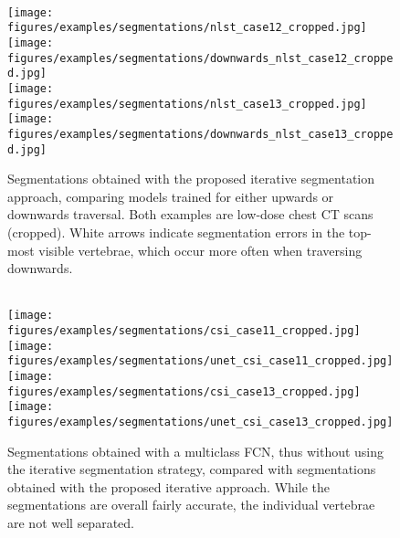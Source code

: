 \documentclass[authoryear,5p,final,times]{elsarticle}
\begin{document}
	\begin{figure*}[t]
    	\begin{minipage}[t]{0.49\textwidth}
    	    \centering%
    	    \begin{minipage}[t]{\columnwidth}
        		\footnotesize\centering%
                \hspace{1ex}%
        	\end{minipage}\\[1ex]%
    		\texttt{[image: figures/examples/segmentations/nlst\_case12\_cropped.jpg]}%
            \hspace{1ex}%
            \texttt{[image: figures/examples/segmentations/downwards\_nlst\_case12\_cropped.jpg]}\\[1.5ex]%
    		\texttt{[image: figures/examples/segmentations/nlst\_case13\_cropped.jpg]}%
            \hspace{1ex}%
    		\texttt{[image: figures/examples/segmentations/downwards\_nlst\_case13\_cropped.jpg]}%
    		\caption{Segmentations obtained with the proposed iterative segmentation approach, comparing models trained for either upwards or downwards traversal. Both examples are low-dose chest CT scans (cropped). White arrows indicate segmentation errors in the top-most visible vertebrae, which occur more often when traversing downwards.}
    		\label{fig:examples_downwards_traversal}
    	\end{minipage}%
    	\hfill%
    	\begin{minipage}[t]{0.49\textwidth}
    	    \centering%
    	    \begin{minipage}[t]{\columnwidth}
        		\footnotesize\centering%
        		\hspace{1ex}%
        	\end{minipage}\\[1ex]%
    		\texttt{[image: figures/examples/segmentations/csi\_case11\_cropped.jpg]}%
    		\hspace{1ex}%
    		\texttt{[image: figures/examples/segmentations/unet\_csi\_case11\_cropped.jpg]}\\[1.5ex]%
    		\texttt{[image: figures/examples/segmentations/csi\_case13\_cropped.jpg]}%
    		\hspace{1ex}%
    		\texttt{[image: figures/examples/segmentations/unet\_csi\_case13\_cropped.jpg]}\\[1ex]%
    		\caption{Segmentations obtained with a multiclass FCN, thus without using the iterative segmentation strategy, compared with segmentations obtained with the proposed iterative approach. While the segmentations are overall fairly accurate, the individual vertebrae are not well separated.}
            \label{fig:examples_unet}
    	\end{minipage}
	\end{figure*}
	
\end{document}
